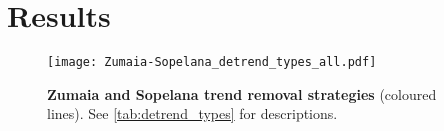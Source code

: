 \documentclass[draft]{agujournal2019}
\begin{document}


\section{Results}\label{sec:results}


\begin{figure}[htbp]
  \centering
  \texttt{[image: Zumaia-Sopelana\_detrend\_types\_all.pdf]}
  \caption{\label{fig:detrend}
    \textbf{Zumaia and Sopelana trend removal strategies} (coloured lines).
    See \cref{tab:detrend_types} for descriptions.
    }
\end{figure}
\end{document}
